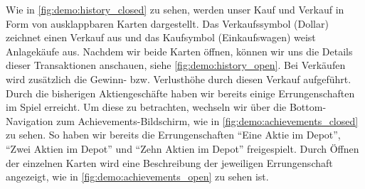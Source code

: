 \documentclass[a4paper]{article}
\begin{document}
Wie in \autoref{fig:demo:history_closed} zu sehen, werden unser Kauf und Verkauf in Form von ausklappbaren Karten dargestellt. Das Verkaufssymbol (Dollar) zeichnet einen Verkauf aus und das Kaufsymbol (Einkaufswagen) weist Anlagekäufe aus. Nachdem wir beide Karten öffnen, können wir uns die Details dieser Transaktionen anschauen, siehe \autoref{fig:demo:history_open}. Bei Verkäufen wird zusätzlich die Gewinn- bzw. Verlusthöhe durch diesen Verkauf aufgeführt.\newline
Durch die bisherigen Aktiengeschäfte haben wir bereits einige Errungenschaften im Spiel erreicht. Um diese zu betrachten, wechseln wir über die Bottom-Navigation zum Achievements-Bildschirm, wie in \autoref{fig:demo:achievements_closed} zu sehen. So haben wir bereits die Errungenschaften "`Eine Aktie im Depot"', "`Zwei Aktien im Depot"' und "`Zehn Aktien im Depot"' freigespielt. Durch Öffnen der einzelnen Karten wird eine Beschreibung der jeweiligen Errungenschaft angezeigt, wie in  \autoref{fig:demo:achievements_open} zu sehen ist.
\end{document}
